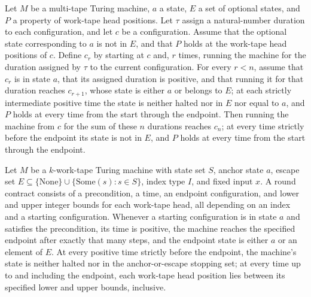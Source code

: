 \begin{theorem}
\label{Turing.Round.iterate}
\leanok
{}
Let $M$ be a multi-tape Turing machine, $a$ a state, $E$ a set of optional states, and
$P$ a property of work-tape head positions. Let $\tau$ assign a natural-number duration
to each configuration, and let $c$ be a configuration. Assume that the optional state
corresponding to $a$ is not in $E$, and that $P$ holds at the work-tape head positions
of $c$. Define $c_r$ by starting at $c$ and, $r$ times, running the machine for the
duration assigned by $\tau$ to the current configuration. For every $r<n$, assume that
$c_r$ is in state $a$, that its assigned duration is positive, and that running it for
that duration reaches $c_{r+1}$, whose state is either $a$ or belongs to $E$; at each
strictly intermediate positive time the state is neither halted nor in $E$ nor equal to
$a$, and $P$ holds at every time from the start through the endpoint. Then running the
machine from $c$ for the sum of these $n$ durations reaches $c_n$; at every time
strictly before the endpoint its state is not in $E$, and $P$ holds at every time from
the start through the endpoint.
\end{theorem}

\begin{definition}
\label{Turing.RoundContract}
\leanok
{}
Let $M$ be a $k$-work-tape Turing machine with state set $S$, anchor state $a$, escape
set $E\subseteq \{\mathrm{None}\}\cup\{\mathrm{Some}(s):s\in S\}$, index type $I$, and
fixed input $x$. A round contract consists of a precondition, a time, an endpoint
configuration, and lower and upper integer bounds for each work-tape head, all depending
on an index and a starting configuration. Whenever a starting configuration is in state
$a$ and satisfies the precondition, its time is positive, the machine reaches the
specified endpoint after exactly that many steps, and the endpoint state is either $a$
or an element of $E$. At every positive time strictly before the endpoint, the machine's
state is neither halted nor in the anchor-or-escape stopping set; at every time up to
and including the endpoint, each work-tape head position lies between its specified
lower and upper bounds, inclusive.
\end{definition}

